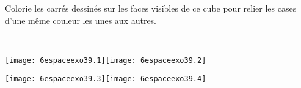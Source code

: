 Colorie les carrés dessinés sur les faces visibles de ce cube pour
relier les cases d'une même couleur les unes aux autres.
\par
{}
\\
\par
\texttt{[image: 6espaceexo39.1]}\hfill\texttt{[image: 6espaceexo39.2]}
\par
\texttt{[image: 6espaceexo39.3]}\hfill\texttt{[image: 6espaceexo39.4]}